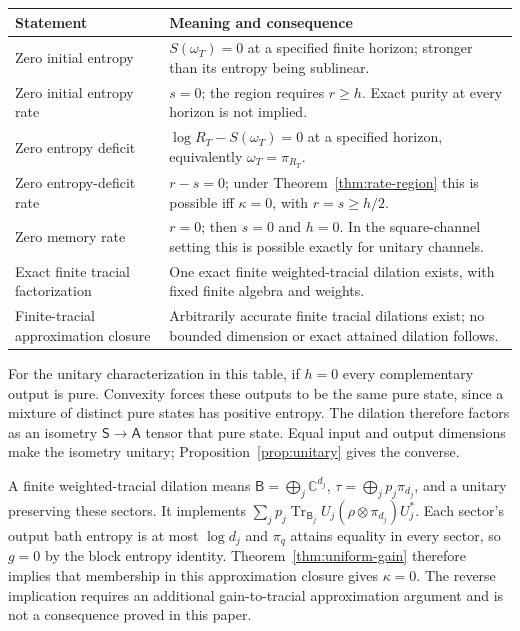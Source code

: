 \documentclass[11pt,a4paper]{article}
\numberwithin{equation}{section}
\theoremstyle{plain}
\theoremstyle{definition}
\DeclareMathOperator{\Tr}{Tr}
\newcommand{\rg}[1]{\mathsf{#1}}
\newcommand{\CC}{\mathbb{C}}
\begin{document}
\begin{center}
\small
\begin{tabular}{@{}>{\raggedright\arraybackslash}p{4.0cm}>{\raggedright\arraybackslash}p{10.4cm}@{}}
\hline
\textbf{Statement} & \textbf{Meaning and consequence}\\
\hline
Zero initial entropy & $S(\omega_T)=0$ at a specified finite horizon; stronger
than its entropy being sublinear.\\
Zero initial entropy rate & $s=0$; the region requires $r\ge h$. Exact purity
at every horizon is not implied.\\
Zero entropy deficit & $\log R_T-S(\omega_T)=0$ at a specified horizon,
equivalently $\omega_T=\pi_{R_T}$.\\
Zero entropy-deficit rate & $r-s=0$; under Theorem~\ref{thm:rate-region} this
is possible iff $\kappa=0$, with $r=s\ge h/2$.\\
Zero memory rate & $r=0$; then $s=0$ and $h=0$. In the square-channel setting
this is possible exactly for unitary channels.\\
Exact finite tracial factorization & One exact finite weighted-tracial
dilation exists, with fixed finite algebra and weights.\\
Finite-tracial approximation closure & Arbitrarily accurate finite tracial
dilations exist; no bounded dimension or exact attained dilation follows.\\
\hline
\end{tabular}
\end{center}

For the unitary characterization in this table, if $h=0$ every complementary
output is pure. Convexity forces these outputs to be the same pure state,
since a mixture of distinct pure states has positive entropy. The dilation
therefore factors as an isometry $\rg{S}\to\rg{A}$ tensor that pure state.
Equal input and output dimensions make the isometry unitary;
Proposition~\ref{prop:unitary} gives the converse.

A finite weighted-tracial dilation means $\rg{B}=\bigoplus_j\CC^{d_j}$,
$\tau=\bigoplus_j p_j\pi_{d_j}$, and a unitary preserving these sectors. It
implements $\sum_j p_j\Tr_{\rg{B}_j}U_j(\rho\otimes\pi_{d_j})U_j^*$. Each
sector's output bath entropy is at most $\log d_j$ and $\pi_q$ attains
equality in every sector, so $g=0$ by the block entropy identity.
Theorem~\ref{thm:uniform-gain} therefore implies that membership in this
approximation closure gives $\kappa=0$. The reverse implication requires an
additional gain-to-tracial approximation argument and is not a consequence
proved in this paper.
\end{document}
